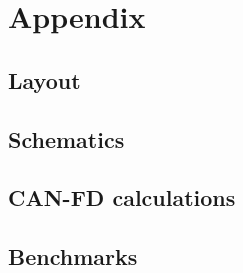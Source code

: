 \section*{Appendix}

\subsection*{Layout}

\subsection*{Schematics}

\subsection*{CAN-FD calculations}

\subsection*{Benchmarks}
